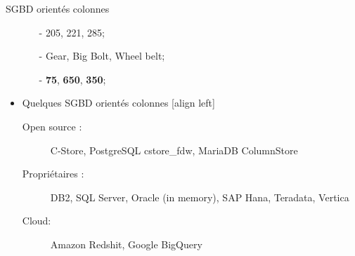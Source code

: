 \begin{frame}{SGBD orientés colonnes}
\begin{itemize}
\begin{minipage}{0.4\linewidth}
    	\end{minipage}
        \begin{minipage}{0.5\linewidth}	
            \begin{itemize}
                \item[-] 205, 221, 285;
                \item[-] Gear, Big Bolt, Wheel belt;
                \item[-] \textbf{75}, \textbf{650}, \textbf{350};
           \end{itemize}
        \end{minipage}
        \item Quelques SGBD orientés colonnes
        [align left]
        \begin{description}
            \item[Open source :] C-Store, PostgreSQL cstore\_fdw, MariaDB ColumnStore
            \item[Propriétaires :]  DB2, SQL Server, Oracle (in memory), SAP Hana, Teradata, Vertica
            \item[Cloud:] Amazon Redshit, Google BigQuery
        \end{description}
    \end{itemize}
\end{frame}